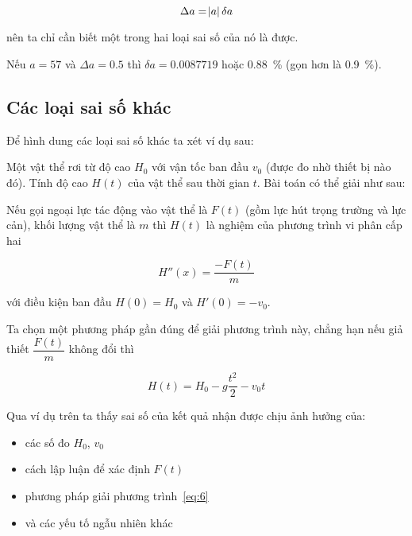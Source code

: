 \documentclass[../../Lectures.tex]{subfiles}
\begin{document}
\begin{equation} \label{eq:5}
    \Delta a = \abs{a}\delta a
\end{equation}

nên ta chỉ cần biết một trong hai loại sai số của nó là được.

\begin{exmp}
    Nếu \(a = \num{57}\) và \(\Delta a = \num{0.5}\) thì \(\delta a =
    \num{0.0087719}\) hoặc \qty{0.88}{\percent} (gọn hơn là \qty{0.9}{\percent}).
\end{exmp}

\subsection{Các loại sai số khác}

Để hình dung các loại sai số khác ta xét ví dụ sau:

\begin{exmp}
    Một vật thể rơi từ độ cao \(H_0\) với vận tốc ban đầu \(v_0\) (được đo nhờ
    thiết bị nào đó). Tính độ cao \(H(t)\) của vật thể sau thời gian \(t\). Bài
    toán có thể giải như sau:

    Nếu gọi ngoại lực tác động vào vật thể là \(F(t)\) (gồm lực hút trọng trường
    và lực cản), khối lượng vật thể là \(m\) thì \(H(t)\) là nghiệm của phương
    trình vi phân cấp hai

    \begin{equation} \label{eq:6}
        H''(x) = \frac{-F(t)}{m}
    \end{equation}

    với điều kiện ban đầu \(H(0) = H_0\) và \(H'(0) = -v_0\).

    Ta chọn một phương pháp gần đúng để giải phương trình này, chẳng hạn nếu giả
    thiết \(\dfrac{F(t)}{m}\) không đổi thì

    \[H(t) = H_0 - g\frac{t^2}{2} -v_0 t\]
\end{exmp}

Qua ví dụ trên ta thấy sai số của kết quả nhận được chịu ảnh hưởng của:

\begin{itemize}
    \item các số đo \(H_0\), \(v_0\)
    \item cách lập luận để xác định \(F(t)\)
    \item phương pháp giải phương trình~\ref{eq:6}
    \item và các yếu tố ngẫu nhiên khác
\end{itemize}
\end{document}
